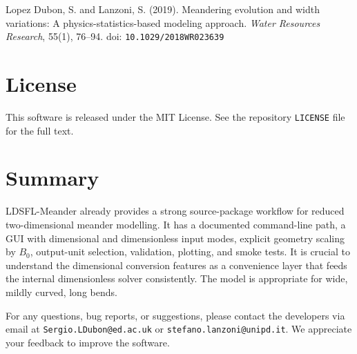 \documentclass[11pt,a4paper]{article}
\begin{document}
\vspace{1.0 em}

\noindent Lopez Dubon, S. and Lanzoni, S. (2019). Meandering evolution and width variations: A physics-statistics-based modeling approach. \textit{Water Resources Research}, 55(1), 76--94. doi: \texttt{10.1029/2018WR023639}

\section{License}

This software is released under the MIT License. See the repository \texttt{LICENSE} file for the full text.

\section{Summary}

LDSFL-Meander already provides a strong source-package workflow for reduced two-dimensional meander modelling. It has a documented command-line path, a GUI with dimensional and dimensionless input modes, explicit geometry scaling by $B_0$, output-unit selection, validation, plotting, and smoke tests. It is crucial to understand the dimensional conversion features as a convenience layer that feeds the internal dimensionless solver consistently. The model is appropriate for wide, mildly curved, long bends.

\vspace{0.5em}
For any questions, bug reports, or suggestions, please contact the developers via email at \texttt{Sergio.LDubon@ed.ac.uk} or \texttt{stefano.lanzoni@unipd.it}. We appreciate your feedback to improve the software.
\end{document}
